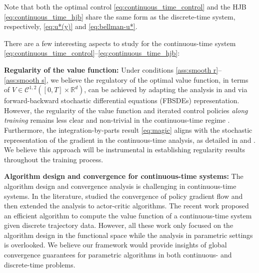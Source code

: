 \documentclass{article}
\begin{document}
Note that both the optimal control \eqref{eq:continuous_time_control} and the HJB \eqref{eq:continuous_time_hjb} share the same form as the discrete-time system, respectively, \eqref{eq:u*(y)} and \eqref{eq:bellman-u*}.


There are a few interesting aspects to study for the continuous-time system \eqref{eq:continuous_time_control}--\eqref{eq:continuous_time_hjb}:

\textbf{Regularity of the value function:} Under conditions \ref{ass:smooth r}--\ref{ass:smooth s}, we believe the regulatory of the optimal value function, in terms of $V\in \mathcal{C}^{1,2}([0,T]\times\mathbb{R}^d)$, can be achieved by adapting the analysis in \cite[Proposition 5.3]{szpruch2021exploration} and \cite[Theorem 4.3.1]{zhang2017backward} via forward-backward stochastic differential equations (FBSDEs) representation. However, the regularity of the value function and iterated control policies {\it along training} remains less clear and non-trivial in the continuous-time regime \cite[Assumption 2]{zhou2023policy}.  Furthermore, the integration-by-parts result \eqref{eq:magic} aligns with the stochastic representation of the gradient in the continuous-time analysis, as detailed in \cite[Eqns 2.12–2.15]{ma2024convergence} and \cite[Chapter 2]{zhang2001some}. We believe this approach will be instrumental in establishing regularity results throughout the training process.

\textbf{Algorithm design and convergence for continuous-time systems:} 
    The algorithm design and convergence analysis is challenging in continuous-time systems. In the literature, \citet{zhou2023policy} studied the convergence of policy gradient flow and then \cite{zhou2024solving} extended the analysis to actor-critic algorithms. The recent work \cite{mou2024bellman} proposed an efficient algorithm to compute the value function of a continuous-time system given discrete trajectory data. However, all these work only focused on the algorithm design in the functional space while the analysis in parametric settings is overlooked. We believe our framework would provide insights of global convergence guarantees for parametric algorithms in both continuous- and discrete-time problems. 
\end{document}
